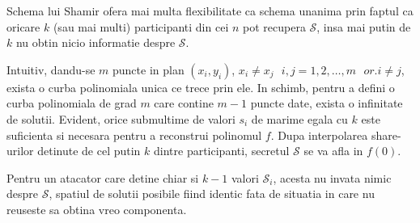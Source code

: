 \documentclass{llncs}
\begin{document}
Schema lui Shamir ofera mai multa flexibilitate ca schema unanima prin faptul ca oricare $k$ (sau mai multi) participanti
din cei $n$ pot recupera $\mathcal{S}$, insa mai putin de $k$ nu obtin nicio informatie despre $\mathcal{S}$.

Intuitiv, dandu-se $m$ puncte in plan $(x_i, y_i)$, $x_i \neq x_j \text{ } i,j = 1, 2, \dots, m \text{ } or. i \neq j$, exista o curba polinomiala unica ce trece prin ele.  
In schimb, pentru a defini o curba polinomiala de grad $m$ care contine $m - 1$ puncte date, exista o infinitate de solutii.
Evident, orice submultime de valori $s_i$ de marime egala cu $k$ este suficienta si necesara pentru a reconstrui polinomul $f$. Dupa interpolarea share-urilor detinute de cel putin $k$ dintre participanti, secretul $\mathcal{S}$ se va afla in $f(0)$.

Pentru un atacator care detine chiar si $k-1$ valori $\mathcal{S}_i$, acesta nu invata nimic despre $\mathcal{S}$, spatiul de solutii posibile fiind identic fata de situatia in care nu reuseste sa obtina vreo componenta.
\end{document}
